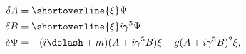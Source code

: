 \begin{equation}
\begin{split}
\label{eq:susy_wz}
  \delta A&=\shortoverline{\xi} \Psi \\
  \delta B&=\shortoverline{\xi} i\gamma^5 \Psi\\
  \delta \Psi&=-(i\dslash+m)(A+i\gamma^5 B)\xi
                -g(A+i\gamma^5B)^2\xi, 
\end{split}
\end{equation}

